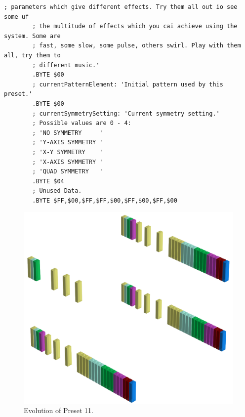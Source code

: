 \begin{lstlisting}[basicstyle=\ttfamily\tiny,caption=Source code for Preset 10.]
        ; parameters which give different effects. Try them all out io see some uf
        ; the multitude of effects which you cai achieve using the system. Some are
        ; fast, some slow, some pulse, others swirl. Play with them all, try them to
        ; different music.'
        .BYTE $00
        ; currentPatternElement: 'Initial pattern used by this preset.'
        .BYTE $00
        ; currentSymmetrySetting: 'Current symmetry setting.'
        ; Possible values are 0 - 4:
        ; 'NO SYMMETRY     '
        ; 'Y-AXIS SYMMETRY '
        ; 'X-Y SYMMETRY    '
        ; 'X-AXIS SYMMETRY '
        ; 'QUAD SYMMETRY   '
        .BYTE $04
        ; Unused Data.
        .BYTE $FF,$00,$FF,$FF,$00,$FF,$00,$FF,$00
\end{lstlisting}


\clearpage                                                                 
\begin{figure}[H]                                                          
    \centering                                                             
    \begin{adjustbox}{width=14cm,center}                                   
      \includegraphics[width=14cm]{src/presets/pattern10-45.png}%
    \end{adjustbox}                                                        
\caption{Evolution of Preset 11.}                                           
\end{figure}                                                               
\clearpage                                                                 
                                                                           
